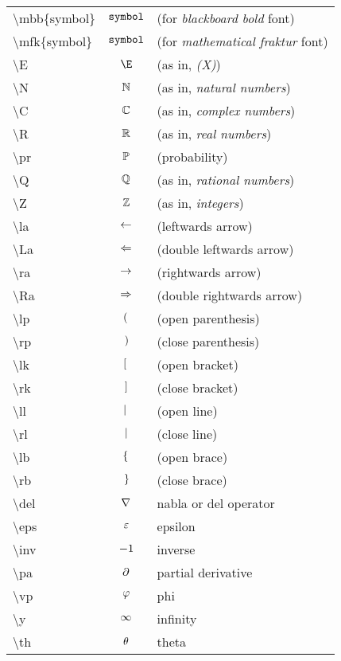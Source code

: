 \noindent
\begin{tabular}{lcl}

\textbackslash mbb\{symbol\} & $\mathbb{\mathtt{symbol}}$ & (for \emph{blackboard bold} font) \\
\textbackslash mfk\{symbol\} & $\mathfrak{\mathtt{symbol}}$ & (for \emph{mathematical fraktur} font) \\
\textbackslash E & $\E$ & (as in, \emph{\E(X)}) \\
\textbackslash N & $\mathbb{N}$ & (as in, \emph{natural numbers}) \\
\textbackslash C & $\mathbb{C}$ & (as in, \emph{complex numbers}) \\
\textbackslash R & $\mathbb{R}$ & (as in, \emph{real numbers}) \\
\textbackslash pr & $\mathbb{P}$ & (probability) \\
\textbackslash Q & $\mathbb{Q}$ & (as in, \emph{rational numbers}) \\
\textbackslash Z & $\mathbb{Z}$ & (as in, \emph{integers}) \\
\textbackslash la & $\leftarrow$ & (leftwards arrow) \\
\textbackslash La & $\Leftarrow$ & (double leftwards arrow) \\
\textbackslash ra & $\rightarrow$ & (rightwards arrow) \\
\textbackslash Ra & $\Rightarrow$ & (double rightwards arrow) \\
\textbackslash lp & $\lp\r.$ & (open parenthesis) \\
\textbackslash rp & $\l.\rp$ & (close parenthesis) \\
\textbackslash lk & $\lk\r.$ & (open bracket) \\
\textbackslash rk & $\l.\rk$ & (close bracket) \\
\textbackslash ll & $\ll\r.$ & (open line) \\
\textbackslash rl & $\l.\rl$ & (close line) \\
\textbackslash lb & $\lb\r.$ & (open brace) \\
\textbackslash rb & $\l.\rb$ & (close brace) \\
\textbackslash del & $\nabla$ & nabla or del operator \\
\textbackslash eps & $\varepsilon$ & epsilon \\
\textbackslash inv & ${-1}$ & inverse \\
\textbackslash pa & $\partial$ & partial derivative \\
\textbackslash vp & $\varphi$ & phi \\
\textbackslash y & $\infty$ & infinity \\
\textbackslash th & $\theta$ & theta \\
\end{tabular}

